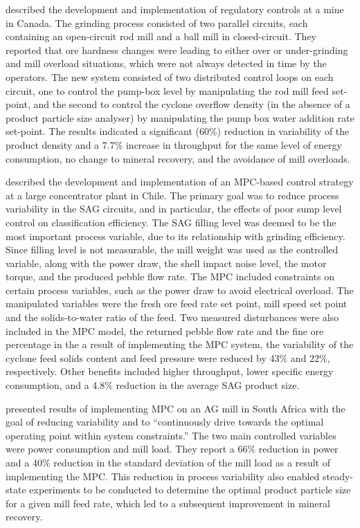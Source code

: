 \cite{nunez_self-optimizing_2009} described the development and implementation of regulatory controls at a mine in Canada. The grinding process consisted of two parallel circuits, each containing an open-circuit rod mill and a ball mill in closed-circuit. They reported that ore hardness changes were leading to either over or under-grinding and mill overload situations, which were not always detected in time by the operators. The new system consisted of two distributed control loops on each circuit, one to control the pump-box level by manipulating the rod mill feed set-point, and the second to control the cyclone overflow density (in the absence of a product particle size analyser) by manipulating the pump box water addition rate set-point. The results indicated a significant (60\%) reduction in variability of the product density and a 7.7\% increase in throughput for the same level of energy consumption, no change to mineral recovery, and the avoidance of mill overloads.

\cite{yutronic_sag_2011} described the development and implementation of an \gls{MPC}-based control strategy at a large concentrator plant in Chile. The primary goal was to reduce process variability in the \acrshort{SAG} circuits, and in particular, the effects of poor sump level control on classification efficiency. The \acrshort{SAG} filling level was deemed to be the most important process variable, due to its relationship with grinding efficiency. Since filling level is not measurable, the mill weight was used as the controlled variable, along with the power draw, the shell impact noise level, the motor torque, and the produced pebble flow rate. The \gls{MPC} included constraints on certain process variables, such as the power draw to avoid electrical overload. The manipulated variables were the fresh ore feed rate set point, mill speed set point and the solids-to-water ratio of the feed. Two measured disturbances were also included in the \gls{MPC} model, the returned pebble flow rate and the fine ore percentage in the  a result of implementing the \gls{MPC} system, the variability of the cyclone feed solids content and feed pressure were reduced by 43\% and 22\%, respectively. Other benefits included higher throughput, lower specific energy consumption, and a 4.8\% reduction in the average \acrshort{SAG} product size.

\cite{steyn_benefits_2013} presented results of implementing \gls{MPC} on an \gls{AG} mill in South Africa with the goal of reducing variability and to ``continuously drive towards the optimal operating point within system constraints.'' The two main controlled variables were power consumption and mill load. They report a 66\% reduction in power and a 40\% reduction in the standard deviation of the mill load as a result of implementing the \gls{MPC}. This reduction in process variability also enabled steady-state experiments to be conducted to determine the optimal product particle size for a given mill feed rate, which led to a subsequent improvement in mineral recovery.

